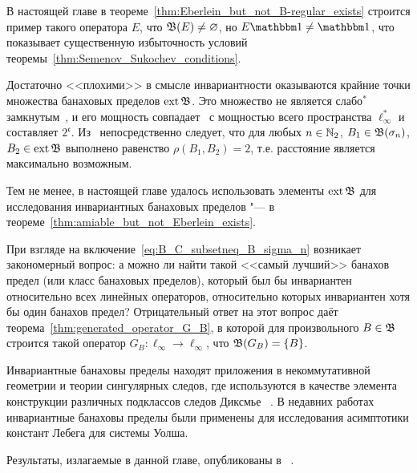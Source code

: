 В настоящей главе в теореме~\ref{thm:Eberlein_but_not_B-regular_exists}
строится пример такого оператора $E$, что $\mathfrak{B}(E)\ne\varnothing$,
но $E\one \ne \one$, что показывает существенную избыточность условий теоремы~\ref{thm:Semenov_Sukochev_conditions}.


Достаточно <<плохими>> в смысле инвариантности оказываются крайние точки множества банаховых пределов $\operatorname{ext} \mathfrak{B}$.
Это множество не является слабо$^*$ замкнутым~\cite{Nillsen,Talagrand},
и его мощность совпадает~\cite{Chou} с мощностью всего пространства $\ell_\infty^*$
и составляет $2^{\mathfrak c}$.
Из~\cite[следствие 6]{semenov2020dilation} непосредственно следует, что для любых
$n\in\mathbb{N}_2$, $B_1 \in \mathfrak{B}(\sigma_n)$, $B_2 \in \operatorname{ext}\mathfrak{B}$ выполнено равенство
$\rho(B_1,B_2) = 2$, т.е. расстояние является максимально возможным.



Тем не менее, в настоящей главе удалось использовать элементы $\operatorname{ext}\mathfrak{B}$ для исследования инвариантных банаховых пределов
"--- в теореме~\ref{thm:amiable_but_not_Eberlein_exists}.

При взгляде на включение~\eqref{eq:B_C_subsetneq_B_sigma_n} возникает закономерный вопрос:
а можно ли найти такой <<самый лучший>> банахов предел (или класс банаховых пределов),
который был бы инвариантен относительно всех линейных операторов,
относительно которых инвариантен хотя бы один банахов предел?
Отрицательный ответ на этот вопрос даёт теорема~\ref{thm:generated_operator_G_B}, в которой
для произвольного $B\in \mathfrak{B}$ строится такой оператор $G_B:\ell_\infty \to \ell_\infty$,
что $\mathfrak{B}(G_B) = \{B\}$.

Инвариантные банаховы пределы находят приложения в некоммутативной геометрии
и теории сингулярных следов, где используются в качестве элемента конструкции
различных подклассов следов Диксмье
~\cite{carey2003spectral,lord2012singular,sukochev2015characterization,sukochev2016dixmier}.
В недавних работах~\cite{astashkin2015constants_rus_DAN,astashkin2016constants_rus_SMJ} инвариантные банаховы пределы были применены для исследования
асимптотики констант Лебега для системы Уолша.


Результаты, излагаемые в данной главе, опубликованы в%
~\cite{
avdeev2024set_DAN_rus,
avdeev2024decomposition,
our-vvmsh-2018,
our-ped-2018-inf-dim-ker,
}.
